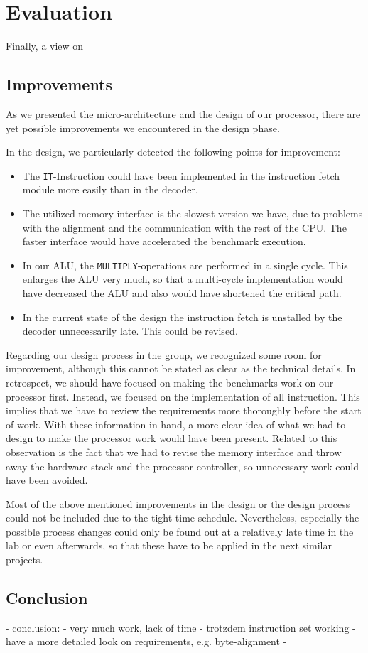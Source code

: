 \chapter{Evaluation}
\label{cha:evaluation}

Finally, a view on 
\section{Improvements}
\label{sec:improvements}
As we presented the micro-architecture and the design of our processor, there are yet possible improvements we encountered in the design phase. 

In the design, we particularly detected the following points for improvement:
\begin{itemize}
\item The \texttt{IT}-Instruction could have been implemented in the instruction fetch module more easily than in the decoder.
\item The utilized memory interface is the slowest version we have, due to problems with the alignment and the communication with the rest of the CPU. The faster interface would have accelerated the benchmark execution.
\item In our ALU, the \texttt{MULTIPLY}-operations are performed in a single cycle. This enlarges the ALU very much, so that a multi-cycle implementation would have decreased the ALU and also would have shortened the critical path.
\item In the current state of the design the instruction fetch is unstalled by the decoder unnecessarily late. This could be revised.
\end{itemize}

Regarding our design process in the group, we recognized some room for improvement, although this cannot be stated as clear as the technical details. In retrospect, we should have focused on making the benchmarks work on our processor first. Instead, we focused on the implementation of all instruction. This implies that we have to review the requirements more thoroughly before the start of work. With these information in hand, a more clear idea of what we had to design to make the processor work would have been present. Related to this observation is the fact that we had to revise the memory interface and throw away the hardware stack and the processor controller, so unnecessary work could have been avoided.
 
Most of the above mentioned improvements in the design or the design process  could not be included due to the tight time schedule. Nevertheless, especially the possible process changes could only be found out at a relatively late time in the lab or even afterwards, so that these have to be  applied in the next similar projects.

\section{Conclusion}
\label{sec:conclusion}
    
- conclusion:
  - very much work, lack of time
  - trotzdem instruction set working
  - have a more detailed look on requirements, e.g. byte-alignment
  - 
  